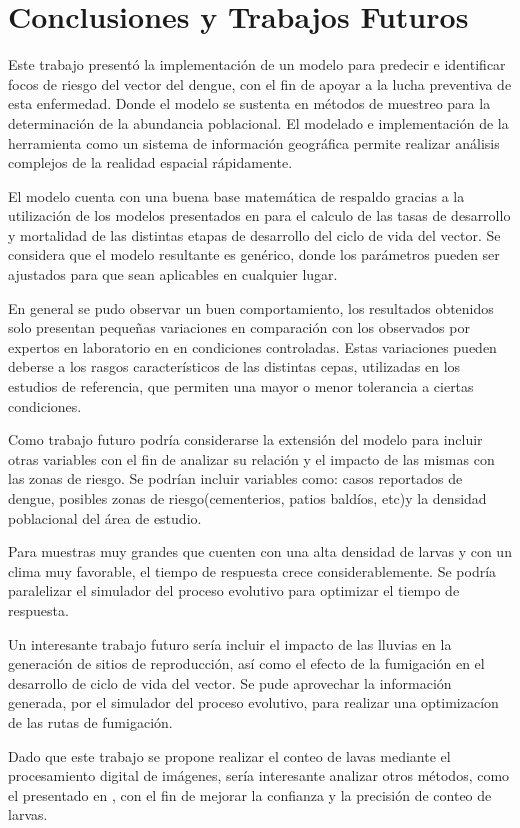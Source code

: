 \chapter{Conclusiones y Trabajos Futuros}
Este trabajo presentó la implementación de un modelo para predecir e identificar focos de riesgo
del vector del dengue, con el fin de apoyar a la lucha preventiva de esta enfermedad. Donde el
modelo se sustenta en métodos de muestreo para la determinación de la abundancia poblacional. El
modelado e implementación de la herramienta como un sistema de información geográfica permite
realizar análisis complejos de la realidad espacial rápidamente.

El modelo cuenta con una buena base matemática de respaldo gracias a la utilización de los modelos
presentados en \cite{sharpe1977reaction, schoolfield1981non, otero2006stochastic} para el
calculo de las tasas de desarrollo y mortalidad de las distintas etapas de desarrollo del ciclo de
vida del vector. Se considera que el modelo resultante es genérico, donde los parámetros pueden ser
ajustados para que sean aplicables en cualquier lugar.

En general se pudo observar un buen comportamiento, los resultados obtenidos solo presentan
pequeñas variaciones en comparación con los observados por expertos en laboratorio en en
condiciones controladas. Estas variaciones pueden deberse a los rasgos característicos de las
distintas cepas, utilizadas en los estudios de referencia, que permiten una mayor o menor
tolerancia a ciertas condiciones.

Como trabajo futuro podría considerarse la extensión del modelo para incluir otras variables
con el fin de analizar su relación y el impacto de las mismas con las zonas de riesgo. Se podrían
incluir variables como: casos reportados de dengue, posibles zonas de riesgo(cementerios, patios
baldíos, etc)y la densidad poblacional del área de estudio.

Para muestras muy grandes que cuenten con una alta densidad de larvas y con un clima muy
favorable, el tiempo de respuesta crece considerablemente. Se podría paralelizar el simulador del
proceso evolutivo para optimizar el tiempo de respuesta.

Un interesante trabajo futuro sería incluir el impacto de las lluvias en la generación de sitios
de reproducción, así como el efecto de la fumigación en el desarrollo de ciclo de vida del vector.
Se pude aprovechar la información generada, por el simulador del proceso evolutivo, para realizar
una optimizacíon de las rutas de fumigación.

Dado que este trabajo se propone realizar el conteo de lavas mediante el procesamiento digital de
imágenes, sería interesante analizar otros métodos, como el presentado en
\cite{gonzalez2008segmentacion}, con el fin de mejorar la confianza y la precisión de conteo de
larvas.
